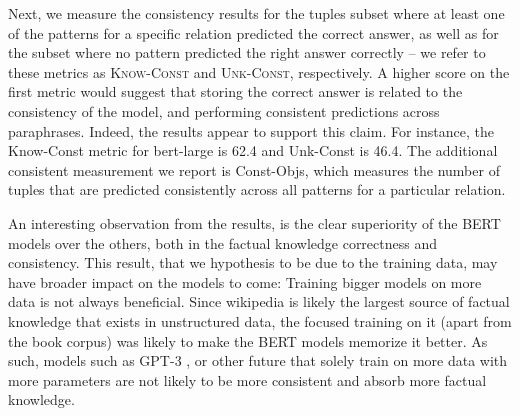 Next, we measure the consistency results for the tuples
subset where at least one of the patterns for a specific
relation predicted the correct answer, as well as for the
subset where no pattern predicted the right answer correctly
-- we refer to these metrics as \textsc{Know-Const} and \textsc{Unk-Const}, respectively.
A higher score on the first metric would suggest that storing the correct answer is related to the consistency of the model, and performing consistent predictions across paraphrases.
Indeed, the results appear to support this claim. For instance, the Know-Const metric for bert-large is 62.4 and Unk-Const is 46.4. 
The additional consistent measurement we report is Const-Objs, which measures the number of tuples that are predicted consistently across all patterns for a particular relation.






An interesting observation from the results, is the clear superiority of the BERT models over the others, both in the factual knowledge correctness and consistency. This result, that we hypothesis to be due to the training data, may have broader impact on the models to come: Training bigger models on more data is not always beneficial. Since wikipedia is likely the largest source of factual knowledge that exists in unstructured data, the focused training on it (apart from the book corpus) was likely to make the BERT models memorize it better.
As such, models such as GPT-3 \cite{gpt3}, or other future that solely train on more data with more parameters are not likely to be more consistent and absorb more factual knowledge.
